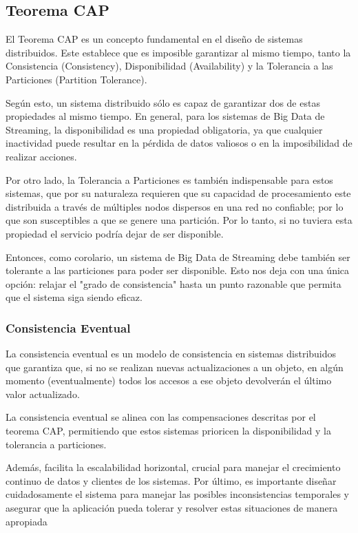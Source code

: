 \subsection{Teorema CAP}
El Teorema CAP es un concepto fundamental en el diseño de sistemas distribuidos. 
Este establece que es imposible garantizar al mismo tiempo, tanto la Consistencia (Consistency), 
Disponibilidad (Availability) y la Tolerancia a las Particiones (Partition Tolerance).\newline

Según esto, un sistema distribuido sólo es capaz de garantizar dos de estas propiedades al mismo tiempo. 
En general, para los sistemas de Big Data de Streaming, la disponibilidad es una propiedad obligatoria, ya que cualquier inactividad puede 
resultar en la pérdida de datos valiosos o en la imposibilidad de realizar acciones.\newline

Por otro lado, la Tolerancia a Particiones es también indispensable para estos sistemas, que por su naturaleza requieren que su capacidad de 
procesamiento este distribuida a través de múltiples nodos dispersos en una red no confiable; por lo que son susceptibles 
a que se genere una partición. Por lo tanto, si no tuviera esta propiedad el servicio podría dejar de ser disponible.\newline 

Entonces, como corolario, un sistema de Big Data de Streaming debe también ser tolerante a las particiones para poder ser disponible.
Esto nos deja con una única opción: relajar el "grado de consistencia" hasta un punto razonable que permita que el sistema siga siendo eficaz.\parencite{capteo}
\newpage
\subsubsection{Consistencia Eventual}
La consistencia eventual es un modelo de consistencia en sistemas distribuidos que garantiza que, 
si no se realizan nuevas actualizaciones a un objeto, en algún momento (eventualmente) todos los accesos a ese objeto 
devolverán el último valor actualizado. \newline

La consistencia eventual se alinea con las compensaciones descritas por el teorema CAP, 
permitiendo que estos sistemas prioricen la disponibilidad y la tolerancia a particiones. \newline

Además, facilita la escalabilidad horizontal, crucial para manejar el crecimiento continuo de datos y clientes de los sistemas.
Por último, es importante diseñar cuidadosamente el sistema para manejar las posibles inconsistencias temporales 
y asegurar que la aplicación pueda tolerar y resolver estas situaciones de manera apropiada \parencite{capteo}

